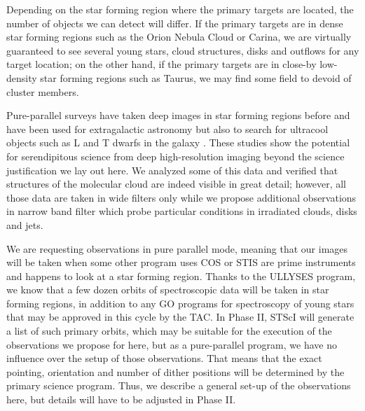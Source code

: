 \documentclass[12pt]{article}
\begin{document}
Depending on the star forming region where the primary targets are located, the
number of objects we can detect will differ. If the primary targets are in
dense star forming regions such as the Orion Nebula Cloud or Carina, we are
virtually guaranteed to see several young stars, cloud structures, disks and
outflows for any target location; on the other hand, if the primary targets are
in close-by low-density star forming regions such as Taurus, we may find some
field to devoid of cluster members. 


Pure-parallel surveys have taken deep images in star forming regions before and
have been used for extragalactic astronomy \citep{2007A&A...468..823S} but also
to search for ultracool objects such as L and T dwarfs in the galaxy
\citep{2005ApJ...631L.159R}. These studies show the potential for serendipitous
science from deep high-resolution imaging beyond the science justification we
lay out here. We analyzed some of this data and verified that structures of the
molecular cloud are indeed visible in great detail; however, all those data are
taken in wide filters only while we propose additional observations in narrow
band filter which probe particular conditions in irradiated clouds, disks and
jets.



%
%
\describeobservations   %
We are requesting observations in pure parallel mode, meaning that our images will be taken when some other program uses COS or STIS are prime instruments and happens to look at a star forming region. Thanks to the ULLYSES program, we know that a few dozen orbits of spectroscopic data will be taken in star forming regions, in addition to any GO programs for spectroscopy of young stars that may be approved in this cycle by the TAC. In Phase II, STScI will generate a list of such primary orbits, which may be suitable for the execution of the observations we propose for here, but as a pure-parallel program, we have no influence over the setup of those observations. That means that the exact pointing, orientation and number of dither positions will be determined by the primary science program. Thus, we describe a general set-up of the observations here, but details will have to be adjusted in Phase II.
\end{document}
